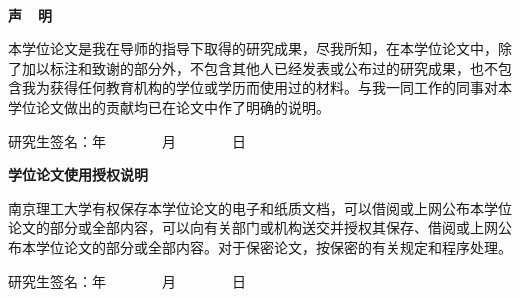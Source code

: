 \newpage %
{
\thispagestyle{empty}
\begin{minipage}{\textwidth}
	\quad\\\quad
\end{minipage}

\begin{center}
	\fontsize{19pt}{\baselineskip}\selectfont\bf 声~~明
\end{center}
{
\fontsize{14.4pt}{1.5\baselineskip}\selectfont

本学位论文是我在导师的指导下取得的研究成果，尽我所知，在本学位论文中，除了加以标注和致谢的部分外，不包含其他人已经发表或公布过的研究成果，也不包含我为获得任何教育机构的学位或学历而使用过的材料。与我一同工作的同事对本学位论文做出的贡献均已在论文中作了明确的说明。\vspace{2em}\par
\noindent 研究生签名：\underline{\makebox[6em]{}}\hspace{7em}年~~~~~~~~月~~~~~~~~日
}
\par\vspace{5em}
\begin{center}
	\fontsize{19pt}{\baselineskip}\selectfont\bf 学位论文使用授权说明
\end{center}
{
\fontsize{14.4pt}{1.5\baselineskip}\selectfont

南京理工大学有权保存本学位论文的电子和纸质文档，可以借阅或上网公布本学位论文的部分或全部内容，可以向有关部门或机构送交并授权其保存、借阅或上网公布本学位论文的部分或全部内容。对于保密论文，按保密的有关规定和程序处理。\vspace{2em}\par
\noindent 研究生签名：\underline{\makebox[6em]{}}\hspace{7em}年~~~~~~~~月~~~~~~~~日
}
}
\newpage %
